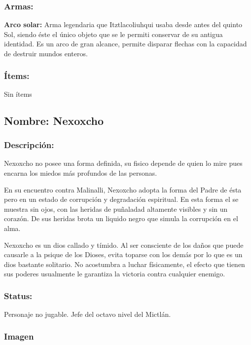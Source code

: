 \documentclass[11pt,letterpaper]{article}
\begin{document}
\subsubsection{Armas:}
\textbf{Arco solar:} Arma legendaria que Itztlacoliuhqui usaba desde antes del quinto Sol, siendo éste el único objeto que se le permiti conservar de su antigua identidad. Es un arco de gran alcance, permite disparar flechas con la capacidad de destruir mundos enteros. 
\subsubsection{Ítems:}
Sin ítems

\subsection{Nombre: Nexoxcho}  \label{per.nexoxcho}
\subsubsection{Descripción:}
Nexoxcho no posee una forma definida, su fisico depende de quien lo mire pues encarna los miedos más profundos de las personas.
\\
\par
En su encuentro contra Malinalli, Nexoxcho adopta la forma del Padre de ésta pero en un estado de corrupción y degradación espiritual. En esta forma el se muestra sin ojos, con las heridas de puñaladad altamente visibles y sin un corazón. De sus heridas brota un liquido negro que simula la corrupción en el alma. 
\\
\par
Nexoxcho es un dios callado y tímido. Al ser consciente de los daños que puede causarle a la psique de los Dioses, evita toparse con los demás por lo que es un dios bastante solitario. No acostumbra a luchar físicamente, el efecto que tienen sus poderes usualmente le garantiza la victoria contra cualquier enemigo.         
\subsubsection{Status:}
Personaje no jugable.
Jefe del octavo nivel del Mictlán.
\subsubsection{Imagen}
\end{document}
